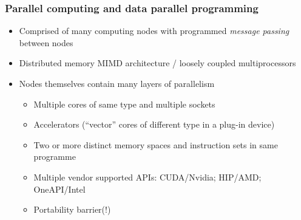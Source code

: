 \documentclass[pdf,ps,8pt]{beamer}
\begin{document}
\begin{frame}[fragile]\small\frametitle{ Parallel computing and data parallel programming}
  \begin{itemize}
  \item Comprised of many computing nodes with programmed \emph{message passing} between nodes
  \item Distributed memory MIMD architecture / loosely coupled multiprocessors
  \item Nodes themselves contain many layers of parallelism
  \begin{itemize}
  \item Multiple cores of same type and multiple sockets 
  \item Accelerators (``vector'' cores of different type in a plug-in device)
  \item Two or more distinct memory spaces and instruction sets in same programme
  \item Multiple vendor supported APIs: CUDA/Nvidia; HIP/AMD; OneAPI/Intel
  \item Portability barrier(!)  
  \end{itemize}
  \end{itemize}
\end{frame}
\end{document}
